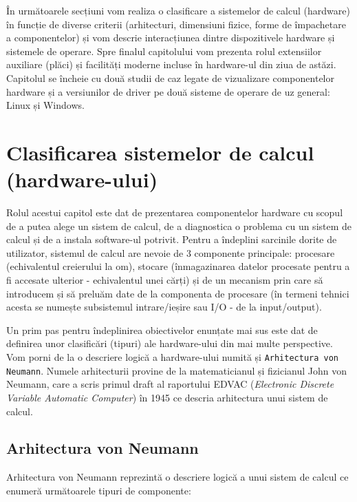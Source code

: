 În următoarele secțiuni vom realiza o clasificare a sistemelor de calcul
(hardware) în funcție de diverse criterii (arhitecturi, dimensiuni fizice, forme
de împachetare a componentelor) și vom descrie interacțiunea dintre
dispozitivele hardware și sistemele de operare. Spre finalul capitolului vom
prezenta rolul extensiilor auxiliare (plăci) și facilități moderne incluse în
hardware-ul din ziua de astăzi. Capitolul se încheie cu două studii de caz
legate de vizualizare componentelor hardware și a versiunilor de driver pe două
sisteme de operare de uz general: Linux și Windows.

\section{Clasificarea sistemelor de calcul (hardware-ului)}
\label{sec:hw:class}

Rolul acestui capitol este dat de prezentarea componentelor hardware cu scopul
de a putea alege un sistem de calcul, de a diagnostica o problema cu un sistem de
calcul și de a instala software-ul potrivit. Pentru a îndeplini sarcinile dorite de utilizator, sistemul de calcul are nevoie de 3
componente principale: procesare (echivalentul creierului la om), stocare
(înmagazinarea datelor procesate pentru a fi accesate ulterior - echivalentul
unei cărți) și de un mecanism prin care să introducem și să preluăm date de la
componenta de procesare (în termeni tehnici acesta se numește subsistemul
intrare/ieșire sau I/O - de la input/output).

Un prim pas pentru îndeplinirea obiectivelor enunțate mai sus este dat de
definirea unor clasificări (tipuri) ale hardware-ului din mai multe perspective.
Vom porni de la o descriere logică a hardware-ului numită și \texttt{Arhitectura
von Neumann}. Numele arhitecturii provine de la matematicianul și fizicianul
John von Neumann, care a scris primul draft al raportului EDVAC
 (\textit{Electronic Discrete Variable Automatic Computer}) în 1945 ce
descria arhitectura unui sistem de calcul.

\subsection{Arhitectura von Neumann}
\label{sec:hw:class:von-neumann}

Arhitectura von Neumann reprezintă o descriere logică a unui sistem de calcul ce
enumeră următoarele tipuri de componente:

